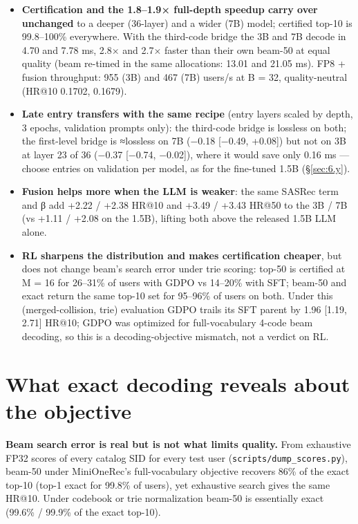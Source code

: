 \documentclass[11pt]{article}
\newcommand{\code}[1]{\texttt{#1}}
\begin{document}
\begin{itemize}
\item \textbf{Certification and the 1.8–1.9× full-depth speedup carry over unchanged} to a deeper (36-layer) and a wider (7B) model; certified top-10 is 99.8–100\% everywhere. With the third-code bridge the 3B and 7B decode in 4.70 and 7.78 ms, 2.8× and 2.7× faster than their own beam-50 at equal quality (beam re-timed in the same allocations: 13.01 and 21.05 ms). FP8 + fusion throughput: 955 (3B) and 467 (7B) users/s at B = 32, quality-neutral (HR@10 0.1702, 0.1679).
\item \textbf{Late entry transfers with the same recipe} (entry layers scaled by depth, 3 epochs, validation prompts only): the third-code bridge is lossless on both; the first-level bridge is ≈lossless on 7B (−0.18 [−0.49, +0.08]) but not on 3B at layer 23 of 36 (−0.37 [−0.74, −0.02]), where it would save only 0.16 ms — choose entries on validation per model, as for the fine-tuned 1.5B (\S\ref{sec:6.y}).
\item \textbf{Fusion helps more when the LLM is weaker}: the same SASRec term and β add +2.22 / +2.38 HR@10 and +3.49 / +3.43 HR@50 to the 3B / 7B (vs +1.11 / +2.08 on the 1.5B), lifting both above the released 1.5B LLM alone.
\item \textbf{RL sharpens the distribution and makes certification cheaper}, but does not change beam's search error under trie scoring: top-50 is certified at M = 16 for 26–31\% of users with GDPO vs 14–20\% with SFT; beam-50 and exact return the same top-10 set for 95–96\% of users on both. Under this (merged-collision, trie) evaluation GDPO trails its SFT parent by 1.96 [1.19, 2.71] HR@10; GDPO was optimized for full-vocabulary 4-code beam decoding, so this is a decoding-objective mismatch, not a verdict on RL.
\end{itemize}

\section{What exact decoding reveals about the objective}\label{sec:6}

\textbf{Beam search error is real but is not what limits quality.} From exhaustive FP32 scores of every catalog SID for every test user (\code{scripts/\allowbreak{}dump\_\allowbreak{}scores.py}), beam-50 under MiniOneRec's full-vocabulary objective recovers 86\% of the exact top-10 (top-1 exact for 99.8\% of users), yet exhaustive search gives the same HR@10. Under codebook or trie normalization beam-50 is essentially exact (99.6\% / 99.9\% of the exact top-10).
\end{document}
